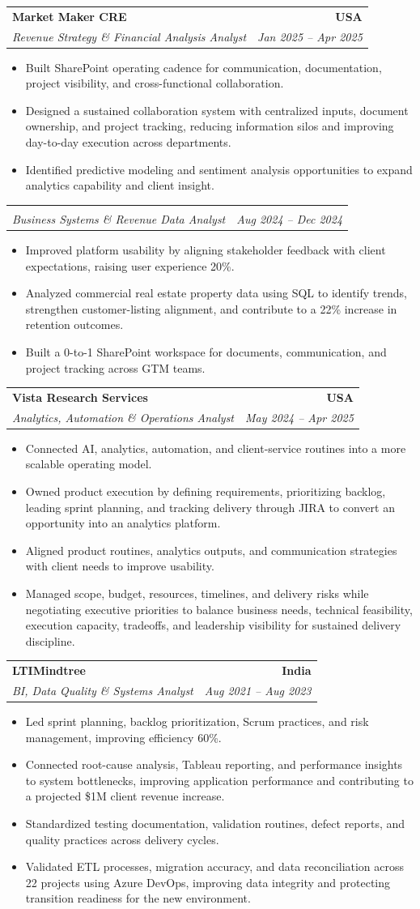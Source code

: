 \documentclass[letterpaper,10pt]{article}
\makeatletter
\newcommand{\resumeItem}[1]{\item \small{#1}}
\newcommand{\resumeSubheading}[4]{
  \vspace{1pt}\item
    \begin{tabular*}{1.0\textwidth}[t]{l@{\extracolsep{\fill}}r}
      \textbf{#1} & \textbf{\small #2} \\
      \textit{\small #3} & \textit{\small #4} \\
    \end{tabular*}\vspace{-6pt}
}
\newcommand{\resumeItemListStart}{\begin{itemize}[leftmargin=0.15in, itemsep=1pt, topsep=3pt]}
\newcommand{\resumeItemListEnd}{\end{itemize}\vspace{-2pt}}
\makeatother
\begin{document}
\vspace{-2pt}

\resumeSubheading
{Market Maker CRE}{USA}
{Revenue Strategy \& Financial Analysis Analyst}{Jan 2025 -- Apr 2025}
\resumeItemListStart
\resumeItem{Built SharePoint operating cadence for communication, documentation, project visibility, and cross-functional collaboration.}
\resumeItem{Designed a sustained collaboration system with centralized inputs, document ownership, and project tracking, reducing information silos and improving day-to-day execution across departments.}
\resumeItem{Identified predictive modeling and sentiment analysis opportunities to expand analytics capability and client insight.}
\resumeItemListEnd

\vspace{-12pt}

\resumeSubheading
{}{}
{Business Systems \& Revenue Data Analyst}{Aug 2024 -- Dec 2024}
\resumeItemListStart
\resumeItem{Improved platform usability by aligning stakeholder feedback with client expectations, raising user experience 20\%.}
\resumeItem{Analyzed commercial real estate property data using SQL to identify trends, strengthen customer-listing alignment, and contribute to a 22\% increase in retention outcomes.}
\resumeItem{Built a 0-to-1 SharePoint workspace for documents, communication, and project tracking across GTM teams.}
\resumeItemListEnd

\vspace{-2pt}

\resumeSubheading
{Vista Research Services}{USA}
{Analytics, Automation \& Operations Analyst}{May 2024 -- Apr 2025}
\resumeItemListStart
\resumeItem{Connected AI, analytics, automation, and client-service routines into a more scalable operating model.}
\resumeItem{Owned product execution by defining requirements, prioritizing backlog, leading sprint planning, and tracking delivery through JIRA to convert an opportunity into an analytics platform.}
\resumeItem{Aligned product routines, analytics outputs, and communication strategies with client needs to improve usability.}
\resumeItem{Managed scope, budget, resources, timelines, and delivery risks while negotiating executive priorities to balance business needs, technical feasibility, execution capacity, tradeoffs, and leadership visibility for sustained delivery discipline.}
\resumeItemListEnd

\vspace{-2pt}

\resumeSubheading
{LTIMindtree}{India}
{BI, Data Quality \& Systems Analyst}{Aug 2021 -- Aug 2023}
\resumeItemListStart
\resumeItem{Led sprint planning, backlog prioritization, Scrum practices, and risk management, improving efficiency 60\%.}
\resumeItem{Connected root-cause analysis, Tableau reporting, and performance insights to system bottlenecks, improving application performance and contributing to a projected \$1M client revenue increase.}
\resumeItem{Standardized testing documentation, validation routines, defect reports, and quality practices across delivery cycles.}
\resumeItem{Validated ETL processes, migration accuracy, and data reconciliation across 22 projects using Azure DevOps, improving data integrity and protecting transition readiness for the new environment.}
\resumeItemListEnd
\end{document}
